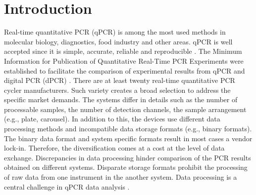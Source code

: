 \documentclass{bioinfo}
\begin{document}
\section{Introduction}
  Real-time quantitative PCR (qPCR) is among the most used methods in molecular 
biology, diagnostics, food industry and other areas. qPCR is well accepted since 
it is simple, accurate, reliable and reproducible \cite{pabinger_2014}. The 
Minimum Information for Publication of Quantitative Real-Time PCR Experiments
were established to facilitate the comparison of experimental results from qPCR 
and digital PCR (dPCR) \cite{huggett_2013}. There are at least twenty real-time 
quantitative PCR cycler manufacturers. Such variety creates a broad selection to 
address the specific market demands. The systems differ in details such as the 
number of processable samples, the number of detection channels, the sample 
arrangement (e.g., plate, carousel). In addition to this, the devices use different 
data processing methods and incompatible data storage formats (e.g.,  binary formats). 
The binary data format and system specific formats result in most cases a vendor 
lock-in. Therefore, the diversification comes at a cost at the level of data 
exchange. Discrepancies in data processing hinder comparison of the PCR results 
obtained on different systems. Disparate storage formats prohibit the processing 
of raw data from one instrument in the another system. Data processing is a 
central challenge in qPCR data analysis \cite{roediger2015r, 
spiess_impact_2014}.
\end{document}
